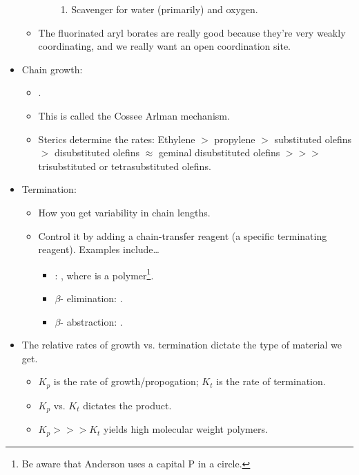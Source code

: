 \documentclass[../notes.tex]{subfiles}
\begin{document}
\begin{itemize}
\begin{itemize}
\begin{itemize}
\begin{enumerate}
                \item Scavenger for water (primarily) and oxygen.
            \end{enumerate}
        \end{itemize}
        \item The fluorinated aryl borates are really good because they're very weakly coordinating, and we really want an open coordination site.
    \end{itemize}
    \item Chain growth:
    \begin{itemize}
        \item {}.
        \item This is called the Cossee Arlman mechanism.
        \item Sterics determine the rates: Ethylene $>$ propylene $>$ substituted olefins $>$ disubstituted olefins $\approx$ geminal disubstituted olefins $>>>$ trisubstituted or tetrasubstituted olefins.
    \end{itemize}
    \item Termination:
    \begin{itemize}
        \item How you get variability in chain lengths.
        \item Control it by adding a chain-transfer reagent (a specific terminating reagent). Examples include\dots
        \begin{itemize}
            \item {}: , where  is a polymer\footnote{Be aware that Anderson uses a capital P in a circle.}.
            \item $\beta$- elimination: .
            \item $\beta$- abstraction: .
        \end{itemize}
    \end{itemize}
    \item The relative rates of growth vs. termination dictate the type of material we get.
    \begin{itemize}
        \item $K_p$ is the rate of growth/propogation; $K_t$ is the rate of termination.
        \item $K_p$ vs. $K_t$ dictates the product.
        \item $K_p>>>K_t$ yields high molecular weight polymers.

\end{itemize}
\end{itemize}
\end{document}
